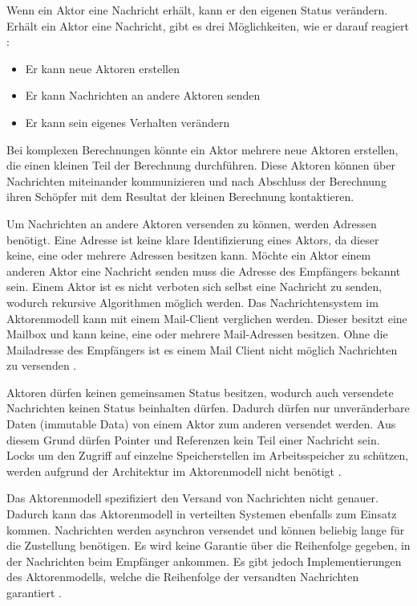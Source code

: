 Wenn ein Aktor eine Nachricht erhält, kann er den eigenen Status verändern. Erhält ein Aktor eine Nachricht, gibt es drei Möglichkeiten, wie er darauf reagiert \cite[p. 84]{Erb2012}:

\begin{itemize}
  \item Er kann neue Aktoren erstellen
  \item Er kann Nachrichten an andere Aktoren senden
  \item Er kann sein eigenes Verhalten verändern
\end{itemize}

Bei komplexen Berechnungen könnte ein Aktor mehrere neue Aktoren erstellen, die einen kleinen Teil der Berechnung durchführen. Diese Aktoren können über Nachrichten miteinander kommunizieren und nach Abschluss der Berechnung ihren Schöpfer mit dem Resultat der kleinen Berechnung kontaktieren. 

Um Nachrichten an andere Aktoren versenden zu können, werden Adressen benötigt. Eine Adresse ist keine klare Identifizierung eines Aktors, da dieser keine, eine oder mehrere Adressen besitzen kann. Möchte ein Aktor einem anderen Aktor eine Nachricht senden muss die Adresse des Empfängers bekannt sein. Einem Aktor ist es nicht verboten sich selbst eine Nachricht zu senden, wodurch rekursive Algorithmen möglich werden. Das Nachrichtensystem im Aktorenmodell kann mit einem Mail-Client verglichen werden. Dieser besitzt eine Mailbox und kann keine, eine oder mehrere Mail-Adressen besitzen. Ohne die Mailadresse des Empfängers ist es einem Mail Client nicht möglich Nachrichten zu versenden \cite[p. 85]{Erb2012}. 

Aktoren dürfen keinen gemeinsamen Status besitzen, wodurch auch versendete Nachrichten keinen Status beinhalten dürfen. Dadurch dürfen nur unveränderbare Daten (immutable Data) von einem Aktor zum anderen versendet werden. Aus diesem Grund dürfen Pointer und Referenzen kein Teil einer Nachricht sein. Locks um den Zugriff auf einzelne Speicherstellen im Arbeitsspeicher zu schützen, werden aufgrund der Architektur im Aktorenmodell  nicht benötigt \cite[p. 85]{Erb2012}.

Das Aktorenmodell spezifiziert den Versand von Nachrichten nicht genauer. Dadurch kann das Aktorenmodell in verteilten Systemen ebenfalls zum Einsatz kommen. Nachrichten werden asynchron versendet und können beliebig lange für die Zustellung benötigen. Es wird keine Garantie über die Reihenfolge gegeben, in der Nachrichten beim Empfänger ankommen. Es gibt jedoch Implementierungen des Aktorenmodells, welche die Reihenfolge der versandten Nachrichten garantiert \cite[p. 85]{Erb2012}.

